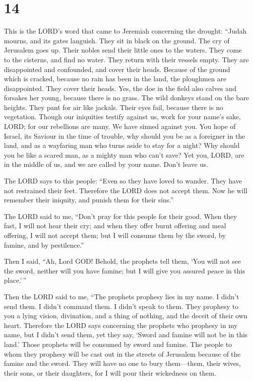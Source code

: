 \hypertarget{section-13}{%
\section{14}\label{section-13}}

 This is the LORD's word that came to Jeremiah concerning
the drought:  ``Judah mourns, and its gates languish. They
sit in black on the ground. The cry of Jerusalem goes up. 
Their nobles send their little ones to the waters. They come to the
cisterns, and find no water. They return with their vessels empty. They
are disappointed and confounded, and cover their heads. 
Because of the ground which is cracked, because no rain has been in the
land, the ploughmen are disappointed. They cover their heads.
 Yes, the doe in the field also calves and forsakes her
young, because there is no grass.  The wild donkeys stand on
the bare heights. They pant for air like jackals. Their eyes fail,
because there is no vegetation.  Though our iniquities
testify against us, work for your name's sake, LORD; for our rebellions
are many. We have sinned against you.  You hope of Israel,
its Saviour in the time of trouble, why should you be as a foreigner in
the land, and as a wayfaring man who turns aside to stay for a night?
 Why should you be like a scared man, as a mighty man who
can't save? Yet you, LORD, are in the middle of us, and we are called by
your name. Don't leave us.

 The LORD says to this people: ``Even so they have loved to
wander. They have not restrained their feet. Therefore the LORD does not
accept them. Now he will remember their iniquity, and punish them for
their sins.''

 The LORD said to me, ``Don't pray for this people for
their good.  When they fast, I will not hear their cry; and
when they offer burnt offering and meal offering, I will not accept
them; but I will consume them by the sword, by famine, and by
pestilence.''

 Then I said, ``Ah, Lord GOD! Behold, the prophets tell
them, `You will not see the sword, neither will you have famine; but I
will give you assured peace in this place.'\,''

 Then the LORD said to me, ``The prophets prophesy lies in
my name. I didn't send them. I didn't command them. I didn't speak to
them. They prophesy to you a lying vision, divination, and a thing of
nothing, and the deceit of their own heart.  Therefore the
LORD says concerning the prophets who prophesy in my name, but I didn't
send them, yet they say, `Sword and famine will not be in this land.'
Those prophets will be consumed by sword and famine.  The
people to whom they prophesy will be cast out in the streets of
Jerusalem because of the famine and the sword. They will have no one to
bury them---them, their wives, their sons, or their daughters, for I
will pour their wickedness on them.

